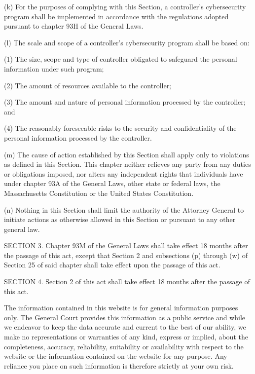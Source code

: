 (k) For the purposes of complying with this Section, a controller’s cybersecurity program shall be implemented in accordance with the regulations adopted pursuant to chapter 93H of the General Laws.

(l) The scale and scope of a controller’s cybersecurity program shall be based on:

(1) The size, scope and type of controller obligated to safeguard the personal information under such program;

(2) The amount of resources available to the controller;

(3) The amount and nature of personal information processed by the controller; and

(4) The reasonably foreseeable risks to the security and confidentiality of the personal information processed by the controller.

(m) The cause of action established by this Section shall apply only to violations as defined in this Section. This chapter neither relieves any party from any duties or obligations imposed, nor alters any independent rights that individuals have under chapter 93A of the General Laws, other state or federal laws, the Massachusetts Constitution or the United States Constitution.

(n) Nothing in this Section shall limit the authority of the Attorney General to initiate actions as otherwise allowed in this Section or pursuant to any other general law.

SECTION 3. Chapter 93M of the General Laws shall take effect 18 months after the passage of this act, except that Section 2 and subsections (p) through (w) of Section 25 of said chapter shall take effect upon the passage of this act. 

SECTION 4. Section 2 of this act shall take effect 18 months after the passage of this act.

The information contained in this website is for general information purposes only. The General Court provides this information as a public service and while we endeavor to keep the data accurate and current to the best of our ability, we make no representations or warranties of any kind, express or implied, about the completeness, accuracy, reliability, suitability or availability with respect to the website or the information contained on the website for any purpose. Any reliance you place on such information is therefore strictly at your own risk.

